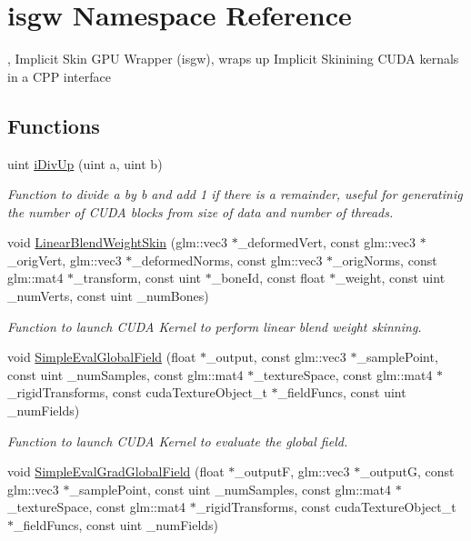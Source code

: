 \hypertarget{namespaceisgw}{}\section{isgw Namespace Reference}
\label{namespaceisgw}


, Implicit Skin G\+PU Wrapper (isgw), wraps up Implicit Skinining C\+U\+DA kernals in a C\+PP interface  


\subsection*{Functions}
\begin{DoxyCompactItemize}
\item 
uint \hyperlink{namespaceisgw_a2e4ac5beae0fbbe25749f7ba5a85805e}{i\+Div\+Up} (uint a, uint b)
\begin{DoxyCompactList}\small\item\em Function to divide a by b and add 1 if there is a remainder, useful for generatinig the number of C\+U\+DA blocks from size of data and number of threads. \end{DoxyCompactList}\item 
void \hyperlink{namespaceisgw_a39bc6d7899858b8364613ca9485fad73}{Linear\+Blend\+Weight\+Skin} (glm\+::vec3 $\ast$\+\_\+deformed\+Vert, const glm\+::vec3 $\ast$\+\_\+orig\+Vert, glm\+::vec3 $\ast$\+\_\+deformed\+Norms, const glm\+::vec3 $\ast$\+\_\+orig\+Norms, const glm\+::mat4 $\ast$\+\_\+transform, const uint $\ast$\+\_\+bone\+Id, const float $\ast$\+\_\+weight, const uint \+\_\+num\+Verts, const uint \+\_\+num\+Bones)
\begin{DoxyCompactList}\small\item\em Function to launch C\+U\+DA Kernel to perform linear blend weight skinning. \end{DoxyCompactList}\item 
void \hyperlink{namespaceisgw_a9ae47979d1bf1fae8efed62f8b9f91b6}{Simple\+Eval\+Global\+Field} (float $\ast$\+\_\+output, const glm\+::vec3 $\ast$\+\_\+sample\+Point, const uint \+\_\+num\+Samples, const glm\+::mat4 $\ast$\+\_\+texture\+Space, const glm\+::mat4 $\ast$\+\_\+rigid\+Transforms, const cuda\+Texture\+Object\+\_\+t $\ast$\+\_\+field\+Funcs, const uint \+\_\+num\+Fields)
\begin{DoxyCompactList}\small\item\em Function to launch C\+U\+DA Kernel to evaluate the global field. \end{DoxyCompactList}\item 
void \hyperlink{namespaceisgw_accf545e1ce56c19f17e0da59310a23f1}{Simple\+Eval\+Grad\+Global\+Field} (float $\ast$\+\_\+outputF, glm\+::vec3 $\ast$\+\_\+outputG, const glm\+::vec3 $\ast$\+\_\+sample\+Point, const uint \+\_\+num\+Samples, const glm\+::mat4 $\ast$\+\_\+texture\+Space, const glm\+::mat4 $\ast$\+\_\+rigid\+Transforms, const cuda\+Texture\+Object\+\_\+t $\ast$\+\_\+field\+Funcs, const uint \+\_\+num\+Fields)\hypertarget{namespaceisgw_accf545e1ce56c19f17e0da59310a23f1}{}\label{namespaceisgw_accf545e1ce56c19f17e0da59310a23f1}


\end{DoxyCompactItemize}
